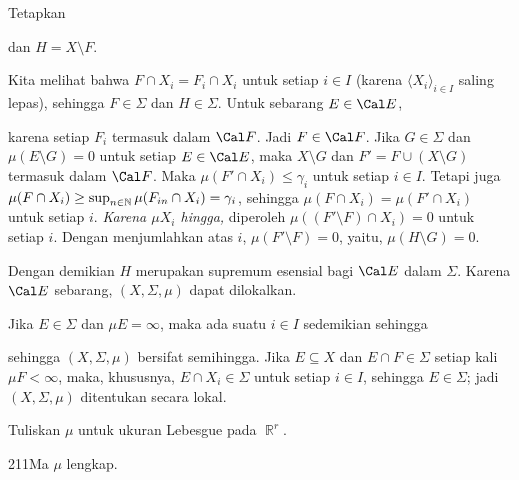 {\noindent Tetapkan
     
     
\noindent dan $H=X\setminus F$.
     
Kita melihat bahwa $F\cap X_i=F_i\cap X_i$ untuk setiap $i\in I$
(karena $\langle X_i\rangle_{i\in I}$ saling lepas), sehingga
$F\in\Sigma$ dan $H\in \Sigma$.   Untuk sebarang $E\in\Cal E$,
     
     
\noindent karena setiap $F_i$ termasuk dalam $\Cal F$.   Jadi
$F\in\Cal F$.   Jika $G\in\Sigma$ dan
$\mu(E\setminus G)=0$ untuk setiap $E\in\Cal E$, maka $X\setminus G$
dan $F'=F\cup(X\setminus G)$ termasuk dalam $\Cal F$.   Maka
$\mu(F'\cap X_i)\le\gamma_i$ untuk setiap $i\in I$.   Tetapi juga
$\mu(F\cap X_i)\ge\sup_{n\in\Bbb N}\mu(F_{in}\cap X_i)=\gamma_i$,
sehingga $\mu(F\cap X_i)=\mu(F'\cap X_i)$ untuk setiap $i$.
{\it Karena $\mu X_i$ hingga,} diperoleh
$\mu((F'\setminus F)\cap X_i)=0$ untuk setiap $i$.   Dengan menjumlahkan
atas $i$, $\mu(F'\setminus F)=0$, yaitu,
$\mu(H\setminus G)=0$.
     
Dengan demikian $H$ merupakan supremum esensial bagi $\Cal E$ dalam
$\Sigma$.   Karena $\Cal E$ sebarang, $(X,\Sigma,\mu)$ dapat dilokalkan.
     
\medskip
     
Jika $E\in\Sigma$ dan $\mu E=\infty$, maka ada suatu $i\in I$
sedemikian sehingga
     
     
\noindent sehingga $(X,\Sigma,\mu)$ bersifat semihingga.   Jika
$E\subseteq X$ dan $E\cap F\in\Sigma$ setiap kali $\mu F<\infty$, maka,
khususnya, $E\cap X_i\in\Sigma$ untuk setiap $i\in I$, sehingga
$E\in\Sigma$;  jadi $(X,\Sigma,\mu)$ ditentukan secara lokal.
}%
     
   Tuliskan $\mu$
untuk ukuran Lebesgue pada $\BbbR^r$.
     
\spheader 211Ma $\mu$ lengkap.
     
